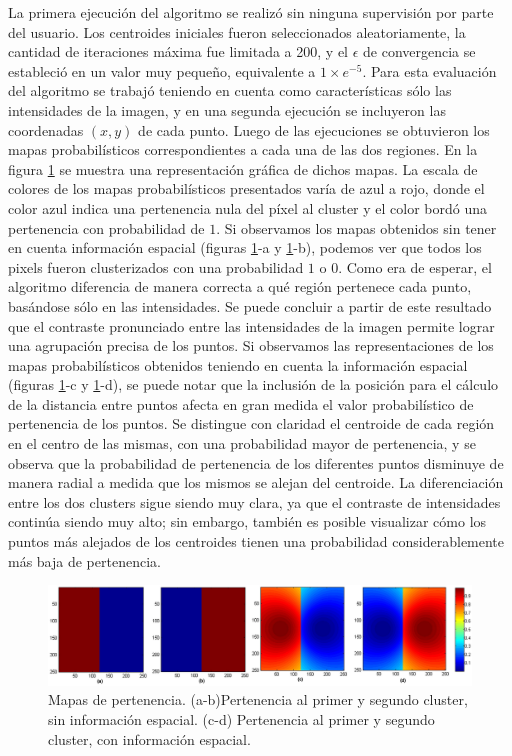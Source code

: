 La primera ejecución del algoritmo se realizó sin ninguna supervisión por parte del usuario. Los centroides iniciales fueron seleccionados aleatoriamente, la cantidad de iteraciones máxima fue limitada a 200, y el $\epsilon$ de convergencia se estableció en un valor muy pequeño, equivalente a $1 \times e^{-5}$. Para esta evaluación del algoritmo se trabajó teniendo en cuenta como características sólo las intensidades de la imagen, y en una segunda ejecución se incluyeron las coordenadas $(x,y)$ de cada punto. Luego de las ejecuciones se obtuvieron los mapas probabilísticos correspondientes a cada una de las dos regiones. En la figura \ref{fig:ejecucion1_mitad_mitad} se muestra una representación gráfica de dichos mapas. La escala de colores de los mapas probabilísticos presentados varía de azul a rojo, donde el color azul indica una pertenencia nula del píxel al cluster y el color bordó una pertenencia con probabilidad de $1$.
Si observamos los mapas obtenidos sin tener en cuenta información espacial (figuras \ref{fig:ejecucion1_mitad_mitad}-a y \ref{fig:ejecucion1_mitad_mitad}-b), podemos ver que todos los pixels fueron clusterizados con una probabilidad $1$ o $0$. Como era de esperar, el algoritmo diferencia de manera correcta a qué región pertenece cada punto, basándose sólo en las intensidades. Se puede concluir a partir de este resultado que el contraste pronunciado entre las intensidades de la imagen permite lograr una agrupación precisa de los puntos.
Si observamos las representaciones de los mapas probabilísticos obtenidos teniendo en cuenta la información espacial (figuras \ref{fig:ejecucion1_mitad_mitad}-c y \ref{fig:ejecucion1_mitad_mitad}-d), se puede notar que la inclusión de la posición para el cálculo de la distancia entre puntos afecta en gran medida el valor probabilístico de pertenencia de los puntos. Se distingue con claridad el centroide de cada región en el centro de las mismas, con una probabilidad mayor de pertenencia, y se observa que la probabilidad de pertenencia de los diferentes puntos disminuye de manera radial a medida que los mismos se alejan del centroide. La diferenciación entre los dos clusters sigue siendo muy clara, ya que el contraste de intensidades continúa siendo muy alto; sin embargo, también es posible visualizar cómo los puntos más alejados de los centroides tienen una probabilidad considerablemente más baja de pertenencia. 

\begin{figure}[H]
\centering
\includegraphics[scale=0.08]{images/mitad_mitad_001.jpg}
\caption{Mapas de pertenencia. (a-b)Pertenencia al primer y segundo cluster, sin información espacial. (c-d) Pertenencia al primer y segundo cluster, con información espacial.}
\label{fig:ejecucion1_mitad_mitad}
\end{figure}


